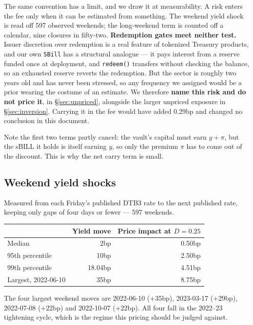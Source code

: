\documentclass[11pt,a4paper]{article}
\newcommand{\note}[1]{{\small\color{muted}#1}}
\begin{document}
The same convention has a limit, and we draw it at measurability. A risk enters the fee
only when it can be estimated from something. The weekend yield shock is read off 597
observed weekends; the long-weekend term is counted off a calendar, nine closures in
fifty-two. \textbf{Redemption gates meet neither test.} Issuer discretion over redemption
is a real feature of tokenized Treasury products, and our own \texttt{SBill} has a
structural analogue — it pays interest from a reserve funded once at deployment, and
\texttt{redeem()} transfers without checking the balance, so an exhausted reserve reverts
the redemption. But the sector is roughly two years old and has never been stressed, so
any frequency we assigned would be a prior wearing the costume of an estimate. We
therefore \textbf{name this risk and do not price it}, in \S\ref{sec:unpriced}, alongside
the larger unpriced exposure in \S\ref{sec:inversion}. Carrying it in the fee would have
added 0.29bp and changed no conclusion in this document.

Note the first two terms partly cancel: the vault's capital must earn $y+\pi$, but the
sBILL it holds is itself earning $y$, so only the premium $\pi$ has to come out of the
discount. This is why the net carry term is small.

\subsection{Weekend yield shocks}

Measured from each Friday's published DTB3 rate to the next published rate, keeping only
gaps of four days or fewer — 597 weekends.

\begin{center}
\small
\begin{tabular}{@{}lrr@{}}
\toprule
& \textbf{Yield move} & \textbf{Price impact at $D=0.25$} \\
\midrule
Median & 2bp & 0.50bp \\
95th percentile & 10bp & 2.50bp \\
99th percentile & 18.04bp & 4.51bp \\
Largest, 2022-06-10 & 35bp & 8.75bp \\
\bottomrule
\end{tabular}
\end{center}

\note{The four largest weekend moves are 2022-06-10 ($+$35bp), 2023-03-17 ($+$29bp),
2022-07-08 ($+$22bp) and 2022-10-07 ($+$22bp). All four fall in the 2022--23 tightening
cycle, which is the regime this pricing should be judged against.}
\end{document}
